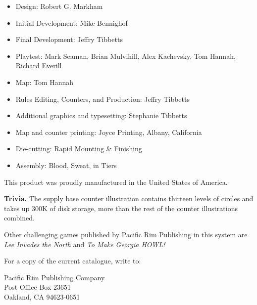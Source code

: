 
\begin{itemize}
\item Design: Robert G. Markham
\item Initial Development: Mike Bennighof
\item Final Development: Jeffry Tibbetts
\item Playtest: Mark Seaman, Brian Mulvihill, Alex Kachevsky, Tom Hannah, Richard Everill
\item Map: Tom Hannah
\item Rules Editing, Counters, and Production: Jeffry Tibbetts
\item Additional graphics and typesetting: Stephanie Tibbetts
\item Map and counter printing: Joyce Printing, Albany, California
\item Die-cutting: Rapid Mounting \& Finishing
\item Assembly: Blood, Sweat, in Tiers
\end{itemize}

This product was proudly manufactured in the United States of America.

\textbf{Trivia.} The supply base counter illustration contains thirteen levels of circles and takes up 300K of disk storage, more than the rest of the counter illustrations combined.

Other challenging games published by Pacific Rim Publishing in this system are \textit{Lee Invades the North} and \textit{To Make Georgia HOWL!}

For a copy of the current catalogue, write to:

Pacific Rim Publishing Company\\
Post Office Box 23651\\
Oakland, CA 94623-0651
